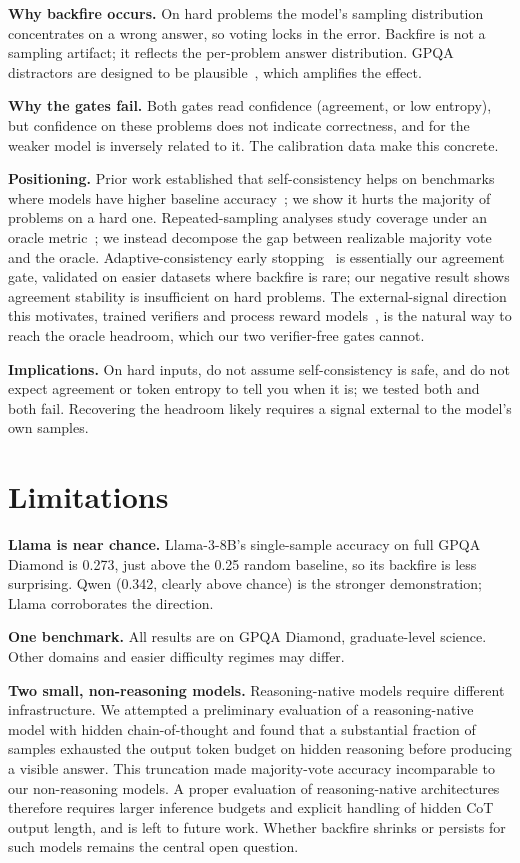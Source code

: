 \documentclass{article}
\begin{document}
\textbf{Why backfire occurs.} On hard problems the model's sampling
distribution concentrates on a wrong answer, so voting locks in the error.
Backfire is not a sampling artifact; it reflects the per-problem answer
distribution. GPQA distractors are designed to be
plausible~\citep{rein2023gpqa}, which amplifies the effect.

\textbf{Why the gates fail.} Both gates read confidence (agreement, or low
entropy), but confidence on these problems does not indicate correctness, and
for the weaker model is inversely related to it. The calibration data make
this concrete.

\textbf{Positioning.} Prior work established that self-consistency helps on
benchmarks where models have higher baseline
accuracy~\citep{wang2023self}; we show it hurts the majority of problems on a
hard one. Repeated-sampling analyses study coverage under an oracle
metric~\citep{brown2024large}; we instead decompose the gap between realizable
majority vote and the oracle. Adaptive-consistency early
stopping~\citep{aggarwal2023adaptive} is essentially our agreement gate,
validated on easier datasets where backfire is rare; our negative result shows
agreement stability is insufficient on hard problems. The external-signal
direction this motivates, trained verifiers and process reward
models~\citep{cobbe2021training, lightman2023verify}, is the natural way to
reach the oracle headroom, which our two verifier-free gates cannot.

\textbf{Implications.} On hard inputs, do not assume self-consistency is safe,
and do not expect agreement or token entropy to tell you when it is; we tested
both and both fail. Recovering the headroom likely requires a signal external
to the model's own samples.

\section{Limitations}

\textbf{Llama is near chance.} Llama-3-8B's single-sample accuracy on full
GPQA Diamond is 0.273, just above the 0.25 random baseline, so its backfire
is less surprising. Qwen (0.342, clearly above chance) is the stronger
demonstration; Llama corroborates the direction.

\textbf{One benchmark.} All results are on GPQA Diamond, graduate-level
science. Other domains and easier difficulty regimes may differ.

\textbf{Two small, non-reasoning models.} Reasoning-native models require
different infrastructure. We attempted a preliminary evaluation of a
reasoning-native model with hidden chain-of-thought and found that a
substantial fraction of samples exhausted the output token budget on hidden
reasoning before producing a visible answer. This truncation made
majority-vote accuracy incomparable to our non-reasoning models. A proper
evaluation of reasoning-native architectures therefore requires larger
inference budgets and explicit handling of hidden CoT output length, and is
left to future work. Whether backfire shrinks or persists for such models
remains the central open question.
\end{document}
